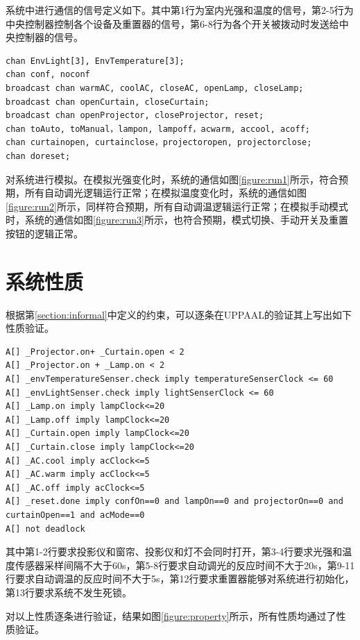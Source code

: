 \documentclass[journal, a4paper]{IEEEtran}
\begin{document}
系统中进行通信的信号定义如下。其中第1行为室内光强和温度的信号，第2-5行为中央控制器控制各个设备及重置器的信号，第6-8行为各个开关被拨动时发送给中央控制器的信号。

\lstset{numbers=left}
\begin{lstlisting}
chan EnvLight[3], EnvTemperature[3];
chan conf, noconf
broadcast chan warmAC, coolAC, closeAC, openLamp, closeLamp;
broadcast chan openCurtain, closeCurtain;
broadcast chan openProjector, closeProjector, reset;
chan toAuto, toManual，lampon, lampoff，acwarm, accool, acoff;
chan curtainopen, curtainclose，projectoropen, projectorclose;
chan doreset;
\end{lstlisting}

对系统进行模拟。在模拟光强变化时，系统的通信如图\ref{figure:run1}所示，符合预期，所有自动调光逻辑运行正常；在模拟温度变化时，系统的通信如图\ref{figure:run2}所示，同样符合预期，所有自动调温逻辑运行正常；在模拟手动模式时，系统的通信如图\ref{figure:run3}所示，也符合预期，模式切换、手动开关及重置按钮的逻辑正常。

\section{系统性质}
\label{section:property}

根据第\ref{section:informal}中定义的约束，可以逐条在UPPAAL的验证其上写出如下性质验证。

\lstset{numbers=left}
\begin{lstlisting}
A[] _Projector.on+ _Curtain.open < 2
A[] _Projector.on + _Lamp.on < 2
A[] _envTemperatureSenser.check imply temperatureSenserClock <= 60
A[] _envLightSenser.check imply lightSenserClock <= 60
A[] _Lamp.on imply lampClock<=20
A[] _Lamp.off imply lampClock<=20
A[] _Curtain.open imply lampClock<=20
A[] _Curtain.close imply lampClock<=20
A[] _AC.cool imply acClock<=5
A[] _AC.warm imply acClock<=5
A[] _AC.off imply acClock<=5
A[] _reset.done imply confOn==0 and lampOn==0 and projectorOn==0 and curtainOpen==1 and acMode==0
A[] not deadlock
\end{lstlisting}

其中第1-2行要求投影仪和窗帘、投影仪和灯不会同时打开，第3-4行要求光强和温度传感器采样间隔不大于60s，第5-8行要求自动调光的反应时间不大于20s，第9-11行要求自动调温的反应时间不大于5s，第12行要求重置器能够对系统进行初始化，第13行要求系统不发生死锁。

对以上性质逐条进行验证，结果如图\ref{figure:property}所示，所有性质均通过了性质验证。
\end{document}
